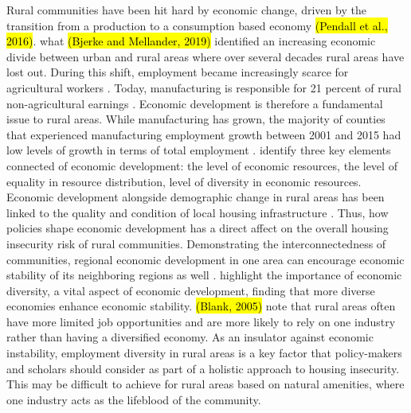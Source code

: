 Rural communities have been hit hard by economic change, driven by the transition from a production to a consumption based economy \hl{(Pendall et al., 2016)}. what \hl{(Bjerke and Mellander, 2019)} identified an increasing economic divide between urban and rural areas where over several decades rural areas have lost out. During this shift, employment became increasingly scarce for agricultural workers \citep{kropczynski_insights_2012}. Today, manufacturing is responsible for 21 percent of rural non-agricultural earnings \citep{low_rural_2017}. Economic development is therefore a fundamental issue to rural areas. While manufacturing has grown, the majority of counties that experienced manufacturing employment growth between 2001 and 2015 had low levels of growth in terms of total employment \citep{low_rural_2017}. \citet{sherrieb_measuring_2010} identify three key elements connected of economic development: the level of economic resources, the level of equality in resource distribution, level of diversity in economic resources. Economic development alongside demographic change in rural areas has been linked to the quality and condition of local housing infrastructure \citep{barcus_heterogeneity_2011}. Thus, how policies shape economic development has a direct affect on the overall housing insecurity risk of rural communities. Demonstrating the interconnectedness of communities, regional economic development in one area can encourage economic stability of its neighboring regions as well \citep{chen_economic_2018}. \citet{deller_spatial_2016} highlight the importance of economic diversity, a vital aspect of economic development, finding that more diverse economies enhance economic stability. \hl{(Blank, 2005)} note that rural areas often have more limited job opportunities and are more likely to rely on one industry rather than having a diversified economy. As an insulator against economic instability, employment diversity in rural areas is a key factor that policy-makers and scholars should consider as part of a holistic approach to housing insecurity. This may be difficult to achieve for rural areas based on natural amenities, where one industry acts as the lifeblood of the community. 

 

